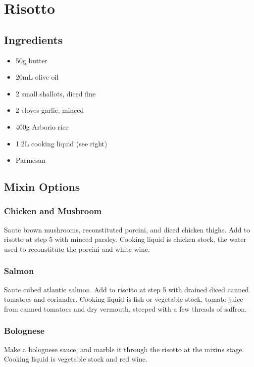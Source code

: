 \section{Risotto}


\begin{multicols}{2}
  \subsection{Ingredients}
    \begin{itemize}
      \item 50g butter
      \item 20mL olive oil
      \item 2 small shallots, diced fine
      \item 2 cloves garlic, minced
      \item 400g Arborio rice
      \item 1.2L cooking liquid (see right)
      \item Parmesan
    \end{itemize}
  \subsection{Mixin Options}
    \subsubsection{Chicken and Mushroom}
      Saute brown mushrooms, reconstituted porcini, and diced chicken thighs. Add to risotto at step 5 with minced parsley. Cooking liquid is chicken stock, the water used to reconstitute the porcini and white wine.
    \subsubsection{Salmon}
      Saute cubed atlantic salmon. Add to risotto at step 5 with drained diced canned tomatoes and coriander. Cooking liquid is fish or vegetable stock, tomato juice from canned tomatoes and dry vermouth, steeped with a few threads of saffron.
    \subsubsection{Bolognese}
      Make a bolognese sauce, and marble it through the risotto at the mixins stage. Cooking liquid is vegetable stock and red wine.

\end{multicols}
